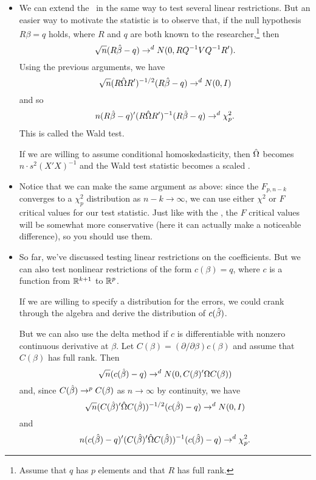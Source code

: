 \begin{itemize}[leftmargin=0pt]
\item We can extend the \ftest\ in the same way to test several linear
  restrictions.  But an easier way to motivate the statistic is to
  observe that, if the null hypothesis $R \beta = q$ holds, where $R$ and
  $q$ are both known to the researcher,\footnote{Assume that $q$ has
  $p$ elements and that $R$ has full rank.} then
  \begin{equation*}
    \sqrt{n} (R \hat{\beta} - q) \to^d N(0, R Q^{-1} V Q^{-1} R').
  \end{equation*}
  Using the previous arguments, we have
  \begin{equation*}
    \sqrt{n} (R \hat{\Omega} R')^{-1/2} (R \hat{\beta} - q) \to^d N(0, I)
  \end{equation*}
  and so
  \begin{equation*}
    n (R \hat{\beta} - q)' (R \hat{\Omega} R')^{-1} (R \hat{\beta} - q) \to^d \chi^2_p.
  \end{equation*}
  This is called the Wald test.

  If we are willing to assume conditional homoskedasticity, then $\hat{\Omega}$
  becomes $n \cdot s^2 (X'X)^{-1}$ and the Wald test statistic becomes a
  scaled \ftest.

\item Notice that we can make the same argument as above: since the
  $F_{p,n-k}$ converges to a $\chi^2_p$ distribution as $n-k \to \infty$, we can
  use either $\chi^2$ or $F$ critical values for our test statistic.  Just
  like with the \ttest, the $F$ critical values will be somewhat more
  conservative (here it can actually make a noticeable difference), so
  you should use them.

\item So far, we've discussed testing linear restrictions on the
  coefficients.  But we can also test nonlinear restrictions of the
  form $c(\beta) = q$, where $c$ is a function from $\mathbb{R}^{k+1}$ to
  $\mathbb{R}^p$.

  If we are willing to specify a distribution for the errors, we could
  crank through the algebra and derive the distribution of $c(\hat{\beta})$.

  But we can also use the delta method if $c$ is differentiable with
  nonzero continuous derivative at $\beta$.  Let $C(\beta) = (\partial/\partial\beta) c(\beta)$ and
  assume that $C(\beta)$ has full rank.  Then
  \begin{equation*}
    \sqrt{n} (c(\hat{\beta}) - q) \to^d N(0, C(\beta)' \Omega C(\beta))
  \end{equation*}
  and, since $C(\hat{\beta}) \to^p C(\beta)$ as $n \to \infty$ by continuity, we have
  \begin{equation*}
    \sqrt{n} (C(\hat{\beta})' \hat{\Omega} C(\hat{\beta}))^{-1/2} (c(\hat{\beta}) - q) \to^d N(0, I)
  \end{equation*}
  and
  \begin{equation*}
    n (c(\hat{\beta}) - q)' (C(\hat{\beta})' \hat{\Omega} C(\hat{\beta}))^{-1} (c(\hat{\beta}) - q) \to^d \chi^2_p.
  \end{equation*}


\end{itemize}
